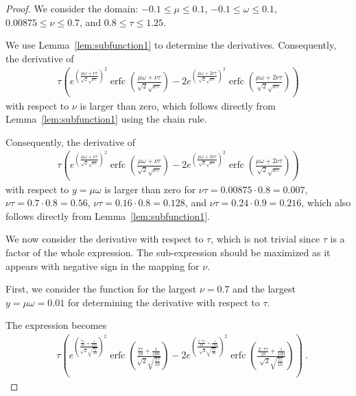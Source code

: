 \documentclass{article}
\renewcommand{\leq}{\leqslant}
\DeclareMathOperator{\erfc}{erfc}
\begin{document}
\begin{proof}
We consider the domain:
$-0.1 \leq \mu \leq 0.1$, 
$-0.1 \leq \omega \leq 0.1$,
$0.00875 \leq \nu \leq 0.7$, and 
$0.8 \leq \tau \leq 1.25$.



We use Lemma~\ref{lem:subfunction1} to determine the derivatives.
Consequently, the derivative of 
\begin{align}
\tau \left(e^{\left(\frac{\mu \omega+\nu \tau}{\sqrt{2} \sqrt{\nu \tau}}\right)^2} \erfc \left(\frac{\mu \omega+\nu \tau}{\sqrt{2} \sqrt{\nu \tau}}\right)-2 e^{\left(\frac{\mu \omega+2  \nu \tau}{\sqrt{2} \sqrt{\nu \tau}}\right)^2} \erfc \left(\frac{\mu \omega+2  \nu \tau}{\sqrt{2} \sqrt{\nu \tau}}\right)\right)
\end{align}
with respect to  $\nu$ is larger than zero, which follows
directly from  Lemma~\ref{lem:subfunction1} using the chain rule.

{Consequently,} the derivative of 
\begin{align}
\tau \left(e^{\left(\frac{\mu \omega+\nu \tau}{\sqrt{2} \sqrt{\nu \tau}}\right)^2} \erfc \left(\frac{\mu \omega+\nu \tau}{\sqrt{2} \sqrt{\nu \tau}}\right)-2 e^{\left(\frac{\mu \omega+2  \nu \tau}{\sqrt{2} \sqrt{\nu \tau}}\right)^2} \erfc \left(\frac{\mu \omega+2  \nu \tau}{\sqrt{2} \sqrt{\nu \tau}}\right)\right)
\end{align}
with respect to  $y=\mu \omega$ is larger than zero for $\nu
\tau=0.00875 \cdot 0.8=0.007$, $\nu
\tau=0.7 \cdot 0.8=0.56$, $\nu
\tau=0.16 \cdot 0.8=0.128$, and $\nu
\tau=0.24 \cdot 0.9=0.216$,
which also follows
directly from  Lemma~\ref{lem:subfunction1}.

We now consider the derivative with respect to $\tau$,
which is not trivial since $\tau$ is a factor of the whole expression.
The sub-expression should be maximized as it appears with
negative sign in the mapping for $\nu$.


First,
we consider the function for  
the largest $\nu = 0.7$ and the largest $y=\mu \omega = 0.01$ 
for determining the derivative with respect to $\tau$. 


The expression becomes
\begin{align}
&\tau \left(e^{\left(\frac{\frac{7  \tau}{10}+\frac{1}{100}}{\sqrt{2} \sqrt{\frac{7  \tau}{10}}}\right)^2} \erfc \left(\frac{\frac{7  \tau}{10}+\frac{1}{100}}{\sqrt{2} \sqrt{\frac{7  \tau}{10}}}\right)-
2 e^{\left(\frac{\frac{2 \cdot 7  \tau}{10}+\frac{1}{100}}{\sqrt{2} \sqrt{\frac{7  \tau}{10}}}\right)^2} \erfc \left(\frac{\frac{2 \cdot 7  \tau}{10}+\frac{1}{100}}{\sqrt{2} \sqrt{\frac{7  \tau}{10}}}\right)\right) \ .
\end{align}


\end{proof}
\end{document}
